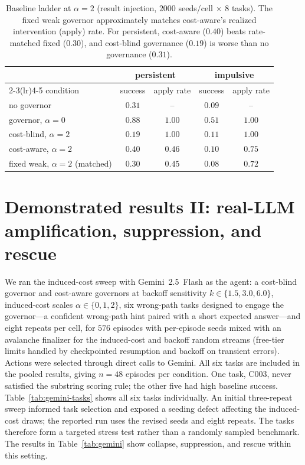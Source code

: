 \documentclass[11pt]{article}
\newcommand{\poweredEpisodes}{576}
\begin{document}
\begin{table}[t]
\centering
\caption{Baseline ladder at $\alpha=2$ (result injection, $2000$ seeds/cell
$\times$ $8$ tasks). The fixed weak governor approximately matches cost-aware's realized
intervention (apply) rate. For persistent, cost-aware ($0.40$) beats
rate-matched fixed ($0.30$), and cost-blind governance ($0.19$) is worse than no
governance ($0.31$).}
\label{tab:baselines}
\begin{tabular}{lcccc}
\toprule
 & \multicolumn{2}{c}{persistent} & \multicolumn{2}{c}{impulsive} \\
\cmidrule(lr){2-3}\cmidrule(lr){4-5}
condition & success & apply rate & success & apply rate \\
\midrule
no governor                 & $0.31$ & --     & $0.09$ & -- \\
governor, $\alpha{=}0$       & $0.88$ & $1.00$ & $0.51$ & $1.00$ \\
cost-blind, $\alpha{=}2$     & $0.19$ & $1.00$ & $0.11$ & $1.00$ \\
cost-aware, $\alpha{=}2$     & $\mathbf{0.40}$ & $0.46$ & $0.10$ & $0.75$ \\
fixed weak, $\alpha{=}2$ (matched) & $0.30$ & $0.45$ & $0.08$ & $0.72$ \\
\bottomrule
\end{tabular}
\end{table}

\section{Demonstrated results II: real-LLM amplification, suppression, and rescue}
\label{sec:gemini}

We ran the induced-cost sweep with Gemini~2.5~Flash as the agent: a cost-blind
governor and cost-aware governors at backoff sensitivity $k\in\{1.5,3.0,6.0\}$,
induced-cost scales $\alpha\in\{0,1,2\}$, six wrong-path tasks designed to engage the governor---a
confident wrong-path hint paired with a short expected answer---and
eight repeats per cell, for $\poweredEpisodes$ episodes with per-episode seeds
mixed with an avalanche finalizer for the induced-cost and backoff random
streams (free-tier limits handled by checkpointed resumption and backoff on
transient errors). Actions were selected through direct calls to Gemini. All
six tasks are included in the pooled results, giving $n=48$ episodes per
condition. One task, C003, never satisfied the substring scoring rule; the
other five had high baseline success. Table~\ref{tab:gemini-tasks} shows all
six tasks individually. An initial three-repeat sweep informed task selection
and exposed a seeding defect affecting the induced-cost draws; the reported
run uses the revised seeds and eight repeats. The tasks therefore form a
targeted stress test rather than a randomly sampled benchmark. The results in
Table~\ref{tab:gemini} show collapse, suppression, and rescue within this
setting.
\end{document}
